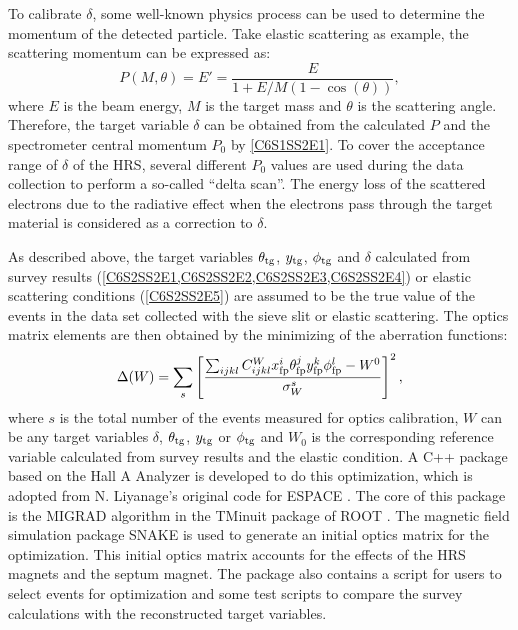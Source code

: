 To calibrate $\delta$, some well-known physics process can be used to determine the momentum of the detected particle. Take elastic scattering as example, the scattering momentum can be expressed as:
\begin{equation} \label{C6S2SS2E5}
P(M,\theta) = E' = \frac{E}{1+E/M(1-\cos(\theta))},
\end{equation}
where $E$ is the beam energy, $M$ is the target mass and $\theta$ is the scattering angle. Therefore, the target variable $\delta$ can be obtained from the calculated $P$ and the spectrometer central momentum $P_0$ by \cref{C6S1SS2E1}. To cover the acceptance range of $\delta$ of the HRS, several different $P_0$ values are used during the data collection to perform a so-called ``delta scan''. The energy loss of the scattered electrons due to the radiative effect when the electrons pass through the target material is considered as a correction to $\delta$.

As described above, the target variables $\theta_{\mathrm{tg}}$, $y_{\mathrm{tg}}$, $\phi_{\mathrm{tg}}$ and $\delta$ calculated from survey results (\cref{C6S2SS2E1,C6S2SS2E2,C6S2SS2E3,C6S2SS2E4}) or elastic scattering conditions (\cref{C6S2SS2E5}) are assumed to be the true value of the events in the data set collected with the sieve slit or elastic scattering. The optics matrix elements are then obtained by the minimizing of the aberration functions:
\begin{equation} \label{C6S2SS2E6}
\Delta (W) = \sum_s\left[\frac{\sum_{ijkl}C_{ijkl}^{W}x_{\mathrm{fp}}^i\theta_{\mathrm{fp}}^jy_{\mathrm{fp}}^k\phi_{\mathrm{fp}}^l-W^{0}}{\sigma_W^s}\right]^2,
\end{equation}
where $s$ is the total number of the events measured for optics calibration, $W$ can be any target variables $\delta$, $\theta_{\mathrm{tg}}$, $y_{\mathrm{tg}}$ or $\phi_{\mathrm{tg}}$ and $W_0$ is the corresponding reference variable calculated from survey results and the elastic condition. A C++ package based on the Hall A Analyzer \cite{Hansen2015} is developed to do this optimization, which is adopted from N. Liyanage's original code \cite{Liyanage2002} for ESPACE \cite{ESPACE}. The core of this package is the MIGRAD algorithm in the TMinuit package of ROOT \cite{ROOT}. The magnetic field simulation package SNAKE is used to generate an initial optics matrix for the optimization. This initial optics matrix accounts for the effects of the HRS magnets and the septum magnet. The package also contains a script for users to select events for optimization and some test scripts to compare the survey calculations with the reconstructed target variables.


